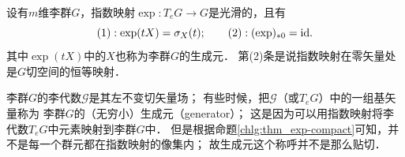 \begin{theorem}\label{chlg:thm_exp-sigma-id}
    设有$m$维李群$G$，指数映射$\exp : T_e G \to G$是光滑的，且有
    \begin{equation}
        (1): \exp(t X)= \sigma_X(t) ; \qquad
        (2): (\exp)_{*0} = {\rm id} .
    \end{equation}
    其中$\exp(t X)$中的$X$也称为李群$G$的{\heiti 生成元}．
    第(2)条是说指数映射在零矢量处是$G$切空间的恒等映射．
\end{theorem}
李群$G$的李代数$\mathscr{G}$是其左不变切矢量场；
有些时候，把$\mathscr{G}$（或$T_eG$）中的一组基矢量称为
李群$G$的（无穷小）{\heiti 生成元}（generator）；        
这是因为可以用指数映射将李代数$T_eG$中元素映射到李群$G$中．
但是根据命题\ref{chlg:thm_exp-compact}可知，并不是每一个群元都在指数映射的像集内；
故{\kaishu 生成元}这个称呼并不是那么贴切．


